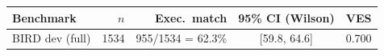 \begin{tabular}{lrrcc}
\toprule
Benchmark & $n$ & Exec.\ match & 95\% CI (Wilson) & VES \\
\midrule
BIRD dev (full) & 1534 & 955/1534 = 62.3\% & [59.8, 64.6] & 0.700 \\
\bottomrule
\end{tabular}
